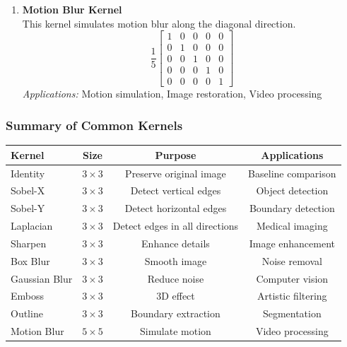 \documentclass[11pt]{article}
\begin{document}
\begin{enumerate}
\item \textbf{Motion Blur Kernel} \\
This kernel simulates motion blur along the diagonal direction.
\[
\frac{1}{5}
\begin{bmatrix}
1 & 0 & 0 & 0 & 0 \\
0 & 1 & 0 & 0 & 0 \\
0 & 0 & 1 & 0 & 0 \\
0 & 0 & 0 & 1 & 0 \\
0 & 0 & 0 & 0 & 1
\end{bmatrix}
\]
\textit{Applications:} Motion simulation, Image restoration, Video processing

\end{enumerate}

\subsubsection*{Summary of Common Kernels}
\begin{center}
\begin{tabular}{lccc}
\toprule
\textbf{Kernel} & \textbf{Size} & \textbf{Purpose} & \textbf{Applications} \\
\midrule
Identity      & $3\times3$ & Preserve original image           & Baseline comparison \\
Sobel-X       & $3\times3$ & Detect vertical edges              & Object detection \\
Sobel-Y       & $3\times3$ & Detect horizontal edges            & Boundary detection \\
Laplacian     & $3\times3$ & Detect edges in all directions     & Medical imaging \\
Sharpen       & $3\times3$ & Enhance details                    & Image enhancement \\
Box Blur      & $3\times3$ & Smooth image                       & Noise removal \\
Gaussian Blur & $3\times3$ & Reduce noise                       & Computer vision \\
Emboss        & $3\times3$ & 3D effect                          & Artistic filtering \\
Outline       & $3\times3$ & Boundary extraction                & Segmentation \\
Motion Blur   & $5\times5$ & Simulate motion                    & Video processing \\
\bottomrule
\end{tabular}
\end{center}
\end{document}
